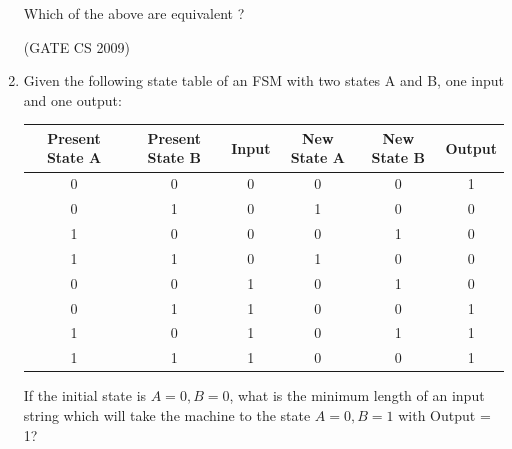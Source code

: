 \documentclass[a4paper, 11pt]{article}
\begin{document}
\begin{enumerate}
    Which of the above are equivalent ?

    \begin{enumerate}
    \end{enumerate}

    \hfill (GATE CS 2009)

    \item Given the following state table of an FSM with two states A and B, one input and one output:\\
    \begin{tabular}{|c|c|c|c|c|c|}
    \hline
        Present State A  & Present State B  & Input & New State A & New State B & Output\\
        \hline
        0  & 0  & 0 & 0 & 0 & 1\\
        \hline
        0  & 1  & 0 & 1 & 0 & 0\\
        \hline
        1  & 0  & 0 & 0 & 1 & 0\\
        \hline
        1  & 1  & 0 & 1 & 0 & 0\\
        \hline
        0  & 0  & 1 & 0 & 1 & 0\\
        \hline
        0  & 1  & 1 & 0 & 0 & 1\\
        \hline
        1  & 0  & 1 & 0 & 1 & 1\\
        \hline
        1  & 1  & 1 & 0 & 0 & 1\\
        \hline
    \end{tabular}

        If the initial state is $A = 0, B = 0$, what is the minimum length of an input string which will take the machine to the state $A= 0, B = 1$ with Output = 1?
        \begin{enumerate}
        \end{enumerate}


\end{enumerate}
\end{document}
